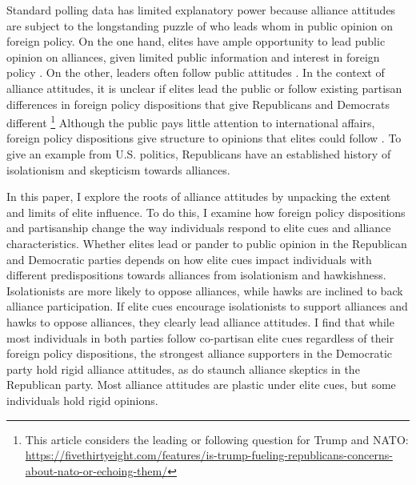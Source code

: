 \documentclass[12pt]{article}
\begin{document}
Standard polling data has limited explanatory power because alliance attitudes are subject to the longstanding puzzle of who leads whom in public opinion on foreign policy.
On the one hand, elites have ample opportunity to lead public opinion on alliances, given limited public information and interest in foreign policy \citep{Canes-Wrone2006, Druckman2014}.
On the other, leaders often follow public attitudes \citep{Barberaetal2019, HagerHilbig2020}.
In the context of alliance attitudes, it is unclear if elites lead the public or follow existing partisan differences in foreign policy dispositions that give Republicans and Democrats different  \footnote{This article considers the leading or following question for Trump and NATO: \url{https://fivethirtyeight.com/features/is-trump-fueling-republicans-concerns-about-nato-or-echoing-them/}}
Although the public pays little attention to international affairs, foreign policy dispositions give structure to opinions that elites could follow \citep{Holsti1992, PageShapiro1992, KertzerZeitzoff2017}.
To give an example from U.S. politics, Republicans have an established history of isolationism and skepticism towards alliances. 


In this paper, I explore the roots of alliance attitudes by unpacking the extent and limits of elite influence. 
To do this, I examine how foreign policy dispositions and partisanship change the way individuals respond to elite cues and alliance characteristics.
Whether elites lead or pander to public opinion in the Republican and Democratic parties depends on how elite cues impact individuals with different predispositions towards alliances from isolationism and hawkishness.  
Isolationists are more likely to oppose alliances, while hawks are inclined to back alliance participation. 
If elite cues encourage isolationists to support alliances and hawks to oppose alliances, they clearly lead alliance attitudes. 
I find that while most individuals in both parties follow co-partisan elite cues regardless of their foreign policy dispositions, the strongest alliance supporters in the Democratic party hold rigid alliance attitudes, as do staunch alliance skeptics in the Republican party. 
Most alliance attitudes are plastic under elite cues, but some individuals hold rigid opinions. 
\end{document}

